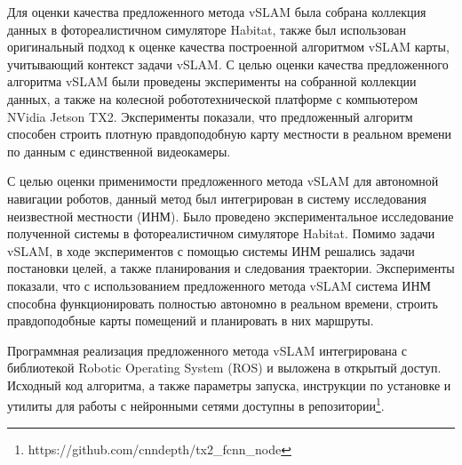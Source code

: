 \documentclass{mipt-thesis-ms}
\begin{document}
	Для оценки качества предложенного метода vSLAM была собрана коллекция данных в фотореалистичном симуляторе Habitat, также был использован оригинальный подход к оценке качества построенной алгоритмом vSLAM карты, учитывающий контекст задачи vSLAM. С целью оценки качества предложенного алгоритма vSLAM были проведены эксперименты на собранной коллекции данных, а также на колесной робототехнической платформе с компьютером NVidia Jetson TX2. Эксперименты показали, что предложенный алгоритм способен строить плотную правдоподобную карту местности в реальном времени по данным с единственной видеокамеры.
	
	С целью оценки применимости предложенного метода vSLAM для автономной навигации роботов, данный метод был интегрирован в систему исследования неизвестной местности (ИНМ). Было проведено экспериментальное исследование полученной системы в фотореалистичном симуляторе Habitat. Помимо задачи vSLAM, в ходе экспериментов с помощью системы ИНМ решались задачи постановки целей, а также планирования и следования траектории. Эксперименты показали, что с использованием предложенного метода vSLAM система ИНМ способна функционировать полностью автономно в реальном времени, строить правдоподобные карты помещений и планировать в них маршруты.
	
	Программная реализация предложенного метода vSLAM интегрирована с библиотекой Robotic Operating System (ROS) и выложена в открытый доступ. Исходный код алгоритма, а также параметры запуска, инструкции по установке и утилиты для работы с нейронными сетями доступны в репозитории\footnote{https://github.com/cnndepth/tx2\_fcnn\_node}.
	 
	\printbibliography
\end{document}
